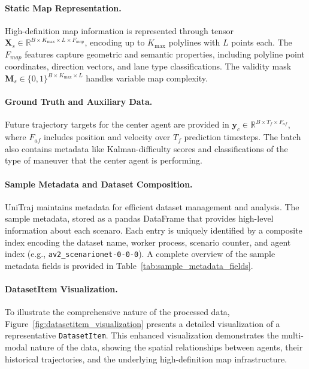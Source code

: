 \paragraph{Static Map Representation.}
High-definition map information is represented through tensor \(\boldsymbol{X}_s \in \mathbb{R}^{B \times K_{\max} \times L \times F_{map}}\), encoding up to \(K_{\max}\) polylines with \(L\) points each. The \(F_{map}\) features capture geometric and semantic properties, including polyline point coordinates, direction vectors, and lane type classifications. The validity mask \(\boldsymbol{M}_s \in \{0,1\}^{B \times K_{\max} \times L}\) handles variable map complexity.

\paragraph{Ground Truth and Auxiliary Data.}
Future trajectory targets for the center agent are provided in \(\boldsymbol{y}_c \in \mathbb{R}^{B \times T_f \times F_{af}}\), where \(F_{af}\) includes position and velocity over \(T_f\) prediction timesteps. The batch also contains metadata like Kalman-difficulty scores and classifications of the type of maneuver that the center agent is performing.

\paragraph{Sample Metadata and Dataset Composition.}
UniTraj maintains metadata for efficient dataset management and analysis. The sample metadata, stored as a pandas DataFrame that provides high-level information about each scenaro. Each entry is uniquely identified by a composite index encoding the dataset name, worker process, scenario counter, and agent index (e.g., \texttt{av2\_scenarionet{-}0{-}0{-}0}). A complete overview of the sample metadata fields is provided in Table~\ref{tab:sample_metadata_fields}.

\paragraph{DatasetItem Visualization.}
To illustrate the comprehensive nature of the processed data, Figure~\ref{fig:datasetitem_visualization} presents a detailed visualization of a representative \texttt{DatasetItem}. This enhanced visualization demonstrates the multi-modal nature of the data, showing the spatial relationships between agents, their historical trajectories, and the underlying high-definition map infrastructure.

